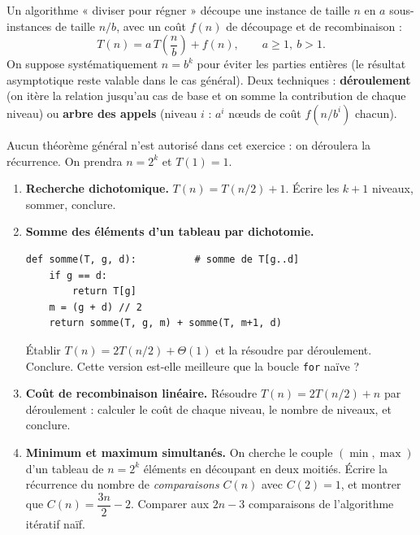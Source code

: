 \documentclass[11pt,a4paper]{article}
\begin{document}

\begin{rappel}
Un algorithme « diviser pour régner » découpe une instance de taille $n$ en $a$
sous-instances de taille $n/b$, avec un coût $f(n)$ de découpage et de recombinaison :
\[
  T(n) = a\,T\!\left(\frac{n}{b}\right) + f(n), \qquad a\ge1,\ b>1.
\]
On suppose systématiquement $n=b^{k}$ pour éviter les parties entières (le résultat
asymptotique reste valable dans le cas général). Deux techniques :
\textbf{déroulement} (on itère la relation jusqu'au cas de base et on somme la
contribution de chaque niveau) ou \textbf{arbre des appels} (niveau $i$ :
$a^{i}$ nœuds de coût $f(n/b^{i})$ chacun).
\end{rappel}

Aucun théorème général n'est autorisé dans cet exercice : on déroulera la récurrence.
On prendra $n=2^k$ et $T(1)=1$.

\begin{enumerate}[label=\arabic*.,leftmargin=*]
  \item \textbf{Recherche dichotomique.} $T(n) = T(n/2) + 1$.
        Écrire les $k+1$ niveaux, sommer, conclure.
  \item \textbf{Somme des éléments d'un tableau par dichotomie.}
\begin{lstlisting}
def somme(T, g, d):          # somme de T[g..d]
    if g == d:
        return T[g]
    m = (g + d) // 2
    return somme(T, g, m) + somme(T, m+1, d)
\end{lstlisting}
        Établir $T(n)=2T(n/2)+\Theta(1)$ et la résoudre par déroulement. Conclure.
        Cette version est-elle meilleure que la boucle \texttt{for} naïve ?
  \item \textbf{Coût de recombinaison linéaire.} Résoudre $T(n) = 2T(n/2) + n$ par
        déroulement : calculer le coût de chaque niveau, le nombre de niveaux, et conclure.
  \item \textbf{Minimum et maximum simultanés.} On cherche le couple $(\min,\max)$ d'un
        tableau de $n=2^k$ éléments en découpant en deux moitiés. Écrire la récurrence
        du nombre de \emph{comparaisons} $C(n)$ avec $C(2)=1$, et montrer que
        $C(n) = \dfrac{3n}{2} - 2$. Comparer aux $2n-3$ comparaisons de l'algorithme
        itératif naïf.
\end{enumerate}
\end{document}

